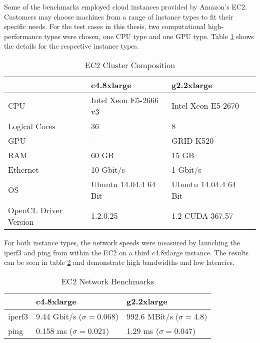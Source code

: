 Some of the benchmarks employed cloud instances provided by Amazon's EC2. Customers may choose machines from a range of instance types to fit their specific needs. For the test cases in this thesis, two computational high-performance types were chosen, one CPU type and one GPU type. Table \ref{table:cluster_setup_ec2} shows the details for the respective instance types.

\begin{table}[!htb]
	\centering
	\begin{adjustbox}{width=0.65\textwidth}
		\small
		\begin{tabular}{l | l | l | l}
			~                     & c4.8xlarge                	& g2.2xlarge                 \\
			\hline
			CPU                   &  Intel Xeon E5-2666 v3 	& Intel Xeon E5-2670 \\
			Logical Cores         &  36 	& 8 \\
			GPU                   &  -						& GRID K520 \\
			RAM                   &  60 GB                       	& 15 GB                       \\
			Ethernet          &  10 Gbit/s                  	& 1 Gbit/s                  \\
			OS                    &  Ubuntu 14.04.4 64 Bit      	& Ubuntu 14.04.4 64 Bit      \\
			OpenCL Driver Version &  1.2.0.25                   & 1.2 CUDA 367.57        \\
		\end{tabular}
	\end{adjustbox}

	\caption{EC2 Cluster Composition}
	\label{table:cluster_setup_ec2}
\end{table}

For both instance types, the network speeds were measured by launching the iperf3 and ping from within the EC2 on a third c4.8xlarge instance. The results can be seen in table \ref{table:ec2_interconnect_benchmarks} and demonstrate high bandwidths and low latencies.

\begin{table}[!htb]
	\centering
	\begin{adjustbox}{width=0.5\textwidth}
		\small
		\begin{tabular}{l | l | l}
			~                     & c4.8xlarge               			& g2.2xlarge                \\
			\hline
			iperf3                & 9.44 Gbit/s ($\sigma = 0.068$) 	& 992.6 MBit/s ($\sigma = 4.8$) \\
			ping                  & 0.158 ms ($\sigma = 0.021$)  		& 1.29 ms ($\sigma = 0.047$)  \\
		\end{tabular}
	\end{adjustbox}

	\caption{EC2 Network Benchmarks}
	\label{table:ec2_interconnect_benchmarks}
\end{table}


